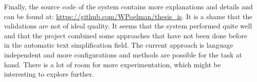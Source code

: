 \documentclass[
10pt, %
a4paper, %
oneside, %
headinclude,footinclude, %
] {book}%
\begin{document}
Finally, the source code of the system contains more explanations and details and can be found at: \url{https://github.com/WPoelman/thesis_is}.
It is a shame that the validations are not of ideal quality.
It seems that the system performed quite well and that the project combined some approaches that have not been done before in the automatic text simplification field.
The current approach is language independent and more configurations and methods are possible for the task at hand.
There is a lot of room for more experimentation, which might be interesting to explore further.




\end{document}
